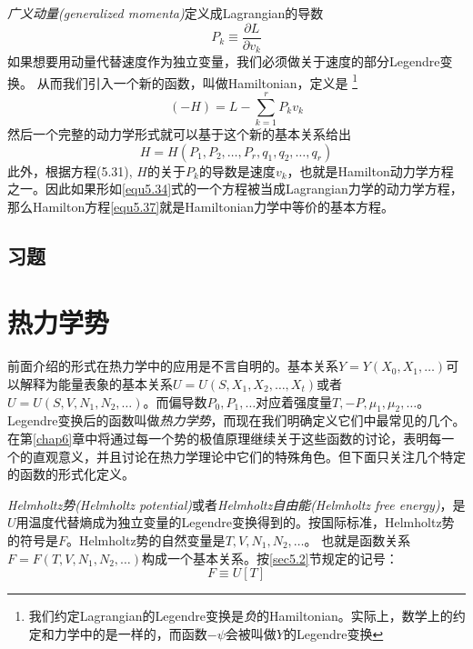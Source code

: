 {\it 广义动量(generalized momenta)}定义成Lagrangian的导数
\begin{equation}
\label{equ5.35}
	P_k \equiv \frac{\partial L}{\partial v_k}
\end{equation}
如果想要用动量代替速度作为独立变量，我们必须做关于速度的部分Legendre变换。
从而我们引入一个新的函数，叫做Hamiltonian，定义是%
\footnote{我们约定Lagrangian的Legendre变换是{\it 负}的Hamiltonian。实际上，数学上的约定和力学中的是一样的，而函数$-\psi$会被叫做$Y$的Legendre变换}%
\begin{equation}
\label{equ5.36}
	(-H)=L-\sum_{k = 1}^r P_kv_k
\end{equation}
然后一个完整的动力学形式就可以基于这个新的基本关系给出
\begin{equation}
\label{equ5.37}
  H=H(P_1,P_2,\dots,P_r,q_1,q_2,\dots,q_r)
\end{equation}
此外，根据方程(5.31), $H$的关于$P_k$的导数是速度$v_k$，也就是Hamilton动力学方程之一。因此如果形如\eqref{equ5.34}式的一个方程被当成Lagrangian力学的动力学方程，那么Hamilton方程\eqref{equ5.37}就是Hamiltonian力学中等价的基本方程。

\subsection*{习题}

\section{热力学势}
\label{sec5.3}
前面介绍的形式在热力学中的应用是不言自明的。基本关系$Y=Y(X_0,X_1,\dots)$可以解释为能量表象的基本关系$U=U(S,X_1,X_2,\dots,X_t)$或者$U=U(S,V,N_1,N_2,\dots)$。而偏导数$P_0,P_1,\dots$对应着强度量$T,-P,\mu_1,\mu_2,\dots$。
Legendre变换后的函数叫做{\it 热力学势}，而现在我们明确定义它们中最常见的几个。在第\ref{chap6}章中将通过每一个势的极值原理继续关于这些函数的讨论，表明每一个的直观意义，并且讨论在热力学理论中它们的特殊角色。但下面只关注几个特定的函数的形式化定义。

{\it Helmholtz势(Helmholtz potential)}或者{\it Helmholtz自由能(Helmholtz free energy)}，是$U$用温度代替熵成为独立变量的Legendre变换得到的。按国际标准，Helmholtz势的符号是$F$。Helmholtz势的自然变量是$T,V,N_1,N_2,\dots$。
也就是函数关系$F=F(T,V,N_1,N_2,\dots)$构成一个基本关系。按\ref{sec5.2}节规定的记号：
\begin{equation}
\label{equ5.38}
	F\equiv U[T]
\end{equation}

